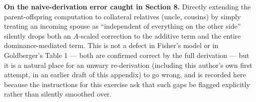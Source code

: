 \documentclass[12pt]{article}
\begin{document}
\textbf{On the naive-derivation error caught in Section 8.} Directly extending the parent-offspring computation to collateral relatives (uncle, cousins) by simply treating an incoming spouse as ``independent of everything on the other side'' silently drops both an $A$-scaled correction to the additive term and the entire dominance-mediated term. This is not a defect in Fisher's model or in Goldberger's Table 1 — both are confirmed correct by the full derivation — but it is a natural place for an unwary re-derivation (including this author's own first attempt, in an earlier draft of this appendix) to go wrong, and is recorded here because the instructions for this exercise ask that such gaps be flagged explicitly rather than silently smoothed over.
\end{document}
